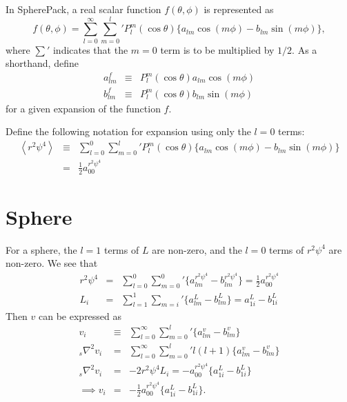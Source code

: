 \documentclass[11pt]{article}
\newcommand{\av}[1]{\left \langle #1 \right \rangle}
\begin{document}
\noindent
In SpherePack, a real scalar function $f(\theta, \phi)$ is represented as
\begin{equation}
f(\theta, \phi) = \sum_{l=0}^{\infty} {\sum_{m=0}^{l}}' P_l^m(\cos \theta)\{ a_{lm} \cos(m\phi) - b_{lm}\sin(m\phi)\},
\end{equation}
where $\sum'$ indicates that the $m=0$ term is to be multiplied by $1/2$.  As a shorthand, define
\begin{eqnarray}
a_{lm}^{f} &\equiv& P_l^m(\cos \theta) a_{lm} \cos(m \phi) \\
b_{lm}^{f} &\equiv& P_l^m(\cos \theta) b_{lm} \sin(m \phi) 
\end{eqnarray}
for a given expansion of the function $f$.

\noindent
Define the following notation for expansion using only the $l=0$ terms:
\begin{eqnarray}
\av{r^2 \psi^4} &\equiv& \sum_{l=0}^{0}{\sum_{m=0}^{l}}' P_l^m(\cos \theta)\{ a_{lm} \cos(m\phi) - b_{lm}\sin(m\phi)\} \\
&=& \frac{1}{2} a_{00}^{r^2 \psi^4}
\end{eqnarray}

\begin{comment}
\noindent
(is this a good idea?) As further shorthand, define
\begin{equation}
Y_{1j} \equiv P_1^j (\cos \theta)\{ a_{1j} \cos(j\phi) - b_{1j}\sin(j\phi)\}
\end{equation}
\end{comment}


\section{Sphere}
For a sphere, the $l=1$ terms of $L$ are non-zero, and the $l=0$ terms of $r^2 \psi^4$ are non-zero.  We see that
\begin{eqnarray}
r^2 \psi^4 &=& \sum_{l=0}^{0} {\sum_{m=0}^{0}}' \{ a_{lm}^{r^2 \psi^4}  - b_{lm}^{r^2 \psi^4} \} = \frac{1}{2} a_{00}^{r^2 \psi^4} \\
L_i &=& \sum_{l=1}^{1} {\sum_{m=i}}' \{ a_{lm}^{L}  - b_{lm}^{L} \} = a_{1i}^{L} - b_{1i}^{L}
\end{eqnarray}
Then $v$ can be expressed as
\begin{eqnarray}
v_i &\equiv& \sum_{l=0}^{\infty} {\sum_{m=0}^{l}}' \{ a_{lm}^{v}  - b_{lm}^{v} \} \\
{_s}\nabla^2 v_i &=& \sum_{l=0}^{\infty} {\sum_{m=0}^{l}}' l(l+1)\{a_{lm}^{v}  - b_{lm}^{v} \} \\
{_s}\nabla^2 v_i &=& -2 r^2 \psi^4 L_i = - a_{00}^{r^2 \psi^4} \{ a_{1i}^{L} - b_{1i}^{L} \}\\
\implies v_i &=& -\frac{1}{2} a_{00}^{r^2 \psi^4} \{ a_{1i}^{L}-b_{1i}^{L} \}.
\end{eqnarray}
\end{document}
